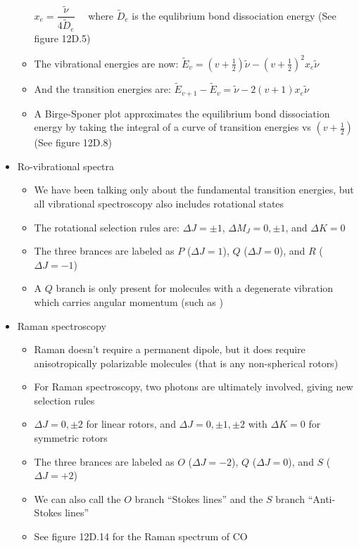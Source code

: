\documentclass[12pt, openany, letterpaper]{memoir}
\begin{document}
\begin{itemize}
\begin{itemize}
		$x_e = \dfrac{\tilde{\nu}}{4\tilde{D}_e}$ ~~where $\tilde{D}_e$ is the equlibrium bond dissociation energy (See figure 12D.5)
		\item The vibrational energies are now: $\tilde{E}_v = \left(v+\frac{1}{2}\right)\tilde{\nu} - \left(v+\frac{1}{2}\right)^2x_e\tilde{\nu}$
		\item And the transition energies are: $\tilde{E}_{v+1}-\tilde{E}_v = \tilde{\nu} -2\left(v+1\right)x_e\tilde{\nu}$
		\item A Birge-Sponer plot approximates the equilibrium bond dissociation energy by taking the integral of a curve of transition energies vs $\left(v+\frac{1}{2}\right)$ (See figure 12D.8)
	\end{itemize}
	\item Ro-vibrational spectra
	\begin{itemize}
		\item We have been talking only about the fundamental transition energies, but all vibrational spectroscopy also includes rotational states
		\item The rotational selection rules are: $\Delta J=\pm 1$, $\Delta M_J=0,\pm1$, and $\Delta K=0$
		\item The three brances are labeled as $P$ ($\Delta J=1$), $Q$ ($\Delta J=0$), and $R$ ($\Delta J=-1$)
		\item A $Q$ branch is only present for molecules with a degenerate vibration which carries angular momentum (such as )
	\end{itemize}
	\item Raman spectroscopy
	\begin{itemize}
		\item Raman doesn't require a permanent dipole, but it does require anisotropically polarizable molecules (that is any non-spherical rotors)
		\item For Raman spectroscopy, two photons are ultimately involved, giving new selection rules
		\item $\Delta J = 0, \pm 2$ for linear rotors, and $\Delta J=0,\pm1,\pm2$ with $\Delta K=0$ for symmetric rotors
		\item The three brances are labeled as $O$ ($\Delta J=-2$), $Q$ ($\Delta J=0$), and $S$ ($\Delta J=+2$)
		\item We can also call the $O$ branch ``Stokes lines'' and the $S$ branch ``Anti-Stokes lines''
		\item See figure 12D.14 for the Raman spectrum of CO
	\end{itemize}
\end{itemize}
\end{document}
